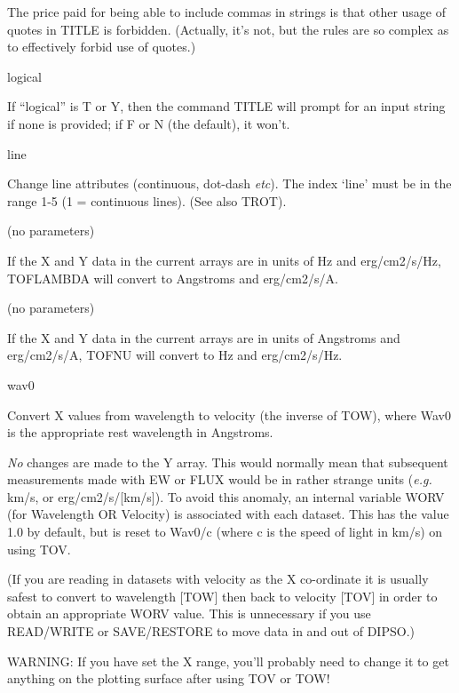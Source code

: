 \begin {description}
The price paid for being able to include commas in strings is that
other usage of quotes in TITLE is forbidden. (Actually, it's not, but
the rules are so complex as to effectively forbid use of quotes.)

\item [TPROMPT] logical

If ``logical'' is T or Y, then the command TITLE will prompt for an
input string if none is provided; if F or N (the default), it won't.

\item [TLINE] line

Change line attributes (continuous, dot-dash {\em etc}). The index `line'
must be in the range 1-5 (1 = continuous lines). (See also TROT).

\item [TOFLAMBDA] (no parameters)

If the X and Y data in the current arrays are in units of Hz and
\newline  erg/cm2/s/Hz, TOFLAMBDA will convert to Angstroms and
erg/cm2/s/A.

\item [TOFNU] (no parameters)

If the X and Y data in the current arrays are in units of Angstroms
and erg/cm2/s/A, TOFNU will convert to Hz and erg/cm2/s/Hz.

\item [TOV] wav0

Convert X values from wavelength to velocity (the inverse of TOW),
where Wav0 is the appropriate rest wavelength in Angstroms.

{\em No} changes are made to the Y array. This would normally mean
that subsequent measurements made with EW or FLUX would be in rather
strange units ({\em e.g.} km/s, or erg/cm2/s/[km/s]). To avoid this
anomaly, an internal variable WORV (for Wavelength OR Velocity) is
associated with each dataset. This has the value 1.0 by default, but
is reset to Wav0/c (where c is the speed of light in km/s) on using
TOV.

(If you are reading in datasets with velocity as the X co-ordinate it
is usually safest to convert to wavelength [TOW] then back to velocity
[TOV] in order to obtain an appropriate WORV value.   This is
unnecessary if you use READ/WRITE or SAVE/RESTORE to move data in and
out of DIPSO.)

WARNING: If you have set the X range, you'll probably need to change
it to get anything on the plotting surface after using TOV or TOW!


\end{description}
